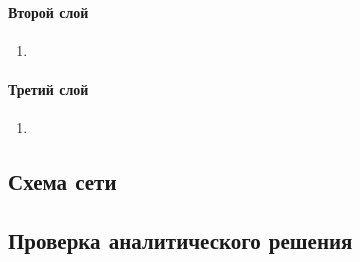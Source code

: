 \paragraph{Второй слой}
\begin{enumerate}
	\item 
\end{enumerate}

\paragraph{Третий слой}
\begin{enumerate}
	\item
\end{enumerate}

\subsection{Схема сети}


\subsection{Проверка аналитического решения}


